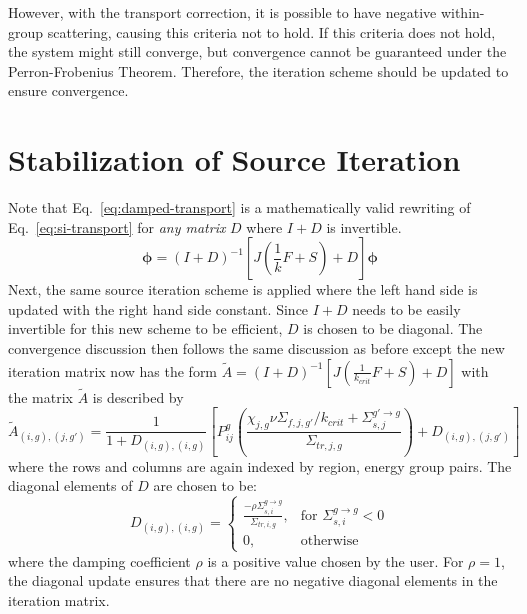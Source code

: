 However, with the transport correction, it is possible to have negative within-group scattering, causing this criteria not to hold. If this criteria does not hold, the system might still converge, but convergence cannot be guaranteed under the Perron-Frobenius Theorem. Therefore, the iteration scheme should be updated to ensure convergence. 

\section{Stabilization of Source Iteration}
\label{sec:diagonal-stabilization}

Note that Eq.~\ref{eq:damped-transport} is a mathematically valid rewriting of Eq.~\ref{eq:si-transport} for \textit{any matrix} $D$ where $I+D$ is invertible. 
\begin{equation}
	\boldsymbol{\phi} = (I+D)^{-1} \left[J \left(\frac{1}{k} F + S \right) + D \right]\boldsymbol{\phi}
	\label{eq:damped-transport}
\end{equation}
Next, the same source iteration scheme is applied where the left hand side is updated with the right hand side constant. Since $I+D$ needs to be easily invertible for this new scheme to be efficient, $D$ is chosen to be diagonal. The convergence discussion then follows the same discussion as before except the new iteration matrix  now has the form $\tilde{A} = (I+D)^{-1} \left[ J \left(\frac{1}{k_{\textit{crit}}} F + S \right) + D \right]$  with the matrix $\tilde{A}$ is described by
\begin{equation}
	\tilde{A}_{(i,g), (j, g')} = \frac{1}{1 + D_{(i,g), (i,g)}}\left[P_{ij}^g \left(\frac{\chi_{j,g} \nu\Sigma_{f,j,g'} / k_{\textit{crit}} + \Sigma_{s,j}^{g' \rightarrow g}}{\Sigma_{\textit{tr}, j, g}}\right) + D_{(i,g), (j, g')}\right]
	\label{eq:a-tilde}
\end{equation}
where the rows and columns are again indexed by region, energy group pairs. The diagonal elements of $D$ are chosen to be:
\begin{equation}
	D_{(i,g), (i,g)} = \left\{\begin{array}{lr}
		\frac{-\rho \Sigma_{s,i}^{g \rightarrow g}}{\Sigma_{\textit{tr}, i, g}} , & \text{for } \Sigma_{s,i}^{g \rightarrow g} < 0\\
		0, & \text{otherwise}
	\end{array}\right.
	\label{eq:d-matrix}
\end{equation}
where the damping coefficient $\rho$ is a positive value chosen by the user. For $\rho = 1$, the diagonal update ensures that there are no negative diagonal elements in the iteration matrix. 


